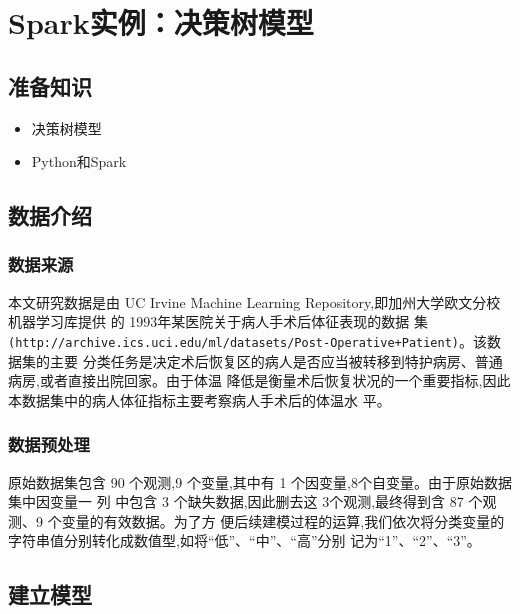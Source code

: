 \section{Spark实例：决策树模型}\label{ux5b9eux4f8bux5206ux6790ux672fux540eux75c5ux4ebaux5b89ux7f6eux65b9ux6848ux7684ux51b3ux7b56ux6811ux6a21ux578b}

\subsection{准备知识}\label{ux51c6ux5907ux77e5ux8bc6}

\begin{itemize}
\itemsep1pt\parskip0pt
\item
  决策树模型
\item
  Python和Spark
\end{itemize}

\subsection{数据介绍}\label{ux6570ux636eux4ecbux7ecd}

\subsubsection{数据来源}\label{ux6570ux636eux6765ux6e90}

本文研究数据是由 UC Irvine Machine Learning Repository,即加州大学欧文分校机器学习库提供
的 1993年某医院关于病人手术后体征表现的数据
集\texttt{(http://archive.ics.uci.edu/ml/datasets/Post-Operative+Patient)}。该数据集的主要
分类任务是决定术后恢复区的病人是否应当被转移到特护病房、普通病房,或者直接出院回家。由于体温
降低是衡量术后恢复状况的一个重要指标,因此本数据集中的病人体征指标主要考察病人手术后的体温水
平。

\subsubsection{数据预处理}\label{ux6570ux636eux9884ux5904ux7406}

原始数据集包含 90 个观测,9 个变量,其中有 1 个因变量,8个自变量。由于原始数据集中因变量一
列 中包含 3 个缺失数据,因此删去这 3个观测,最终得到含 87 个观测、9 个变量的有效数据。为了方
便后续建模过程的运算,我们依次将分类变量的字符串值分别转化成数值型,如将“低”、“中”、“高”分别
记为“1”、“2”、“3”。

\subsection{建立模型}\label{ux5efaux7acbux6a21ux578b}

